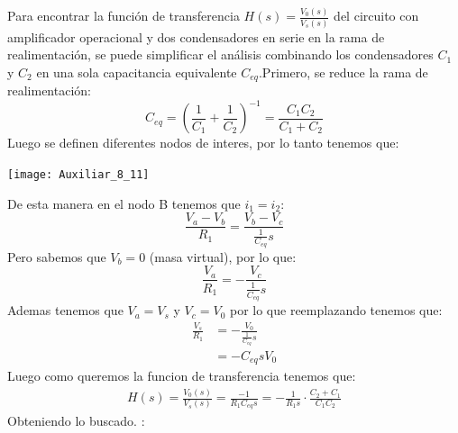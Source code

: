 \documentclass[
  11pt,
  letterpaper,
   addpoints,
   answers
  ]{exam}
\begin{document}
\begin{questions}
\begin{solution}
    Para encontrar la función de transferencia \( H(s) = \frac{V_0(s)}{V_s(s)} \) del circuito con amplificador operacional y dos condensadores en serie en la rama de realimentación, se puede simplificar el análisis combinando los condensadores \( C_1 \) y \( C_2 \) en una sola capacitancia equivalente \( C_{eq} \).Primero, se reduce la rama de realimentación:
\begin{equation}
    C_{eq} = \left( \frac{1}{C_1} + \frac{1}{C_2} \right)^{-1} = \frac{C_1 C_2}{C_1 + C_2}
\end{equation}
Luego se definen diferentes nodos de interes, por lo tanto tenemos que:
\begin{center}
    \texttt{[image: Auxiliar\_8\_11]}
\end{center}
De esta manera en el nodo B tenemos que  $i_1 = i_2$:
\begin{equation}
    \frac{V_a - V_b}{R_1} = \frac{V_b-V_c}{\frac{1}{C_{eq}}s}
\end{equation}
Pero sabemos que \( V_b = 0 \) (masa virtual), por lo que:
\begin{equation}
    \frac{V_a}{R_1} = -\frac{V_c}{\frac{1}{C_{eq}}s}
\end{equation}
Ademas tenemos que \( V_a = V_s \) y \( V_c = V_0 \) por lo que reemplazando tenemos que:
\begin{align}
    \frac{V_s}{R_1} &= -\frac{V_0}{\frac{1}{C_{eq}}s}\\
    &= -C_{eq}s V_0
\end{align}
Luego como queremos la funcion de transferencia tenemos que:
\begin{align}
    H(s) = \frac{V_0(s)}{V_s(s)} = \frac{-1}{R_{1} C_{eq} s}= -\frac{1}{R_1 s} \cdot \frac{C_2 + C_1}{C_1 C_2}
\end{align}
Obteniendo lo buscado. :

\end{solution}
\end{questions}
\end{document}
